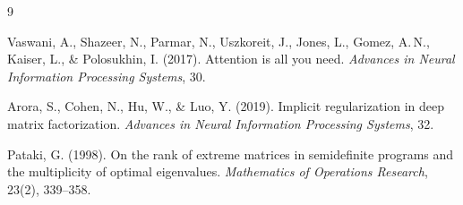\begin{thebibliography}{9}


  Vaswani, A., Shazeer, N., Parmar, N., Uszkoreit, J., Jones, L., Gomez, A.\,N.,
  Kaiser, L., \& Polosukhin, I. (2017).
  Attention is all you need.
  \emph{Advances in Neural Information Processing Systems}, 30.



  Arora, S., Cohen, N., Hu, W., \& Luo, Y. (2019).
  Implicit regularization in deep matrix factorization.
  \emph{Advances in Neural Information Processing Systems}, 32.


  Pataki, G. (1998).
  On the rank of extreme matrices in semidefinite programs and the multiplicity of
  optimal eigenvalues.
  \emph{Mathematics of Operations Research}, 23(2), 339--358.

\end{thebibliography}

